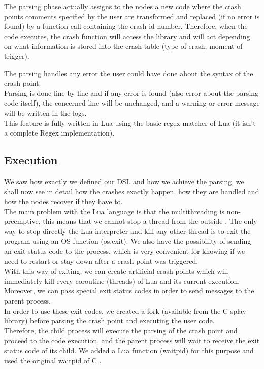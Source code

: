 \documentclass{eplmastersthesis}
\begin{document}
        The parsing phase actually assigns to the nodes a new code where the
        crash points comments specified by the user are transformed and
        replaced (if no error is found) by a function call containing the
        crash id number. Therefore, when the code executes, the crash
        function will access the library and will act depending on what
        information is stored into the crash table (type of crash,
        moment of trigger).

        The parsing handles any error the user could have done about the
        syntax of the crash point.\\
        Parsing is done line by line and if any error is found (also error
        about the parsing code itself), the concerned line will be unchanged, and
        a warning or error message will be written in the logs.\\
        This feature is fully written in Lua using the basic regex matcher of Lua
        \cite{RegexLua} (it isn't a complete Regex implementation).

      \subsection{Execution}

        We saw how exactly we defined our DSL and how we achieve the parsing,
        we shall now see in detail how the crashes exactly happen, how they
        are handled and how the nodes recover if they have to.\\

        The main problem with the Lua language is that the multithreading
        is non-preemptive, this means that we cannot stop a thread from the
        outside \cite{CoroutineLua}. The only way to stop directly the Lua
        interpreter and kill any other thread is to exit the program using
        an OS function (os.exit). We also have the possibility of sending an exit
        status code to the process, which is very convenient for knowing
        if we need to restart or stay down after a crash point was
        triggered.\\

        With this way of exiting, we can create artificial crash points which
        will immediately kill every coroutine (threads) of Lua and its
        current execution. Moreover, we can pass special exit status codes
        in order to send messages to the parent process.\\
        In order to use these exit codes, we created a fork (available from
        the C splay library) before parsing the crash point and executing
        the user code.\\
        Therefore, the child process will execute the parsing of the crash
        point and proceed to the code execution, and the parent process will
        wait to receive the exit status code of its child. We added a Lua
        function (waitpid) for this purpose and used the original waitpid
        of C \cite{waitpid}.\\
\end{document}
